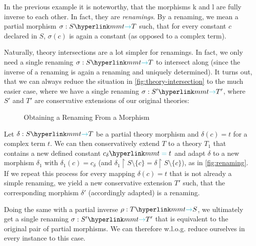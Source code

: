 In the previous example it is noteworthy, that the morphisms \textsf{k} and \textsf{l} are fully inverse to each other. In fact, they are \emph{renamings}.
By a renaming, we mean a partial morphism $\sigma:\viewto ST$ such, that for every constant $c$ declared in $S$, $\sigma(c)$ is again a constant (as opposed to a complex term). 

Naturally, theory intersections are a lot simpler for renamings. In fact, we only need a single renaming $\sigma:\viewto ST$ to intersect along (since the inverse of a renaming is again a renaming and uniquely determined).
It turns out, that we can always reduce the situation in \autoref{fig:theory-intersection} to the much easier case, where we have a single renaming $\sigma:\viewto{S'}{T'}$, where $S'$ and $T'$ are conservative extensions of our original theories:

\begin{figure}[ht]%
\centering
{}%
\caption{Obtaining a Renaming From a Morphism}\label{fig:renaming}%
\end{figure}

Let $\delta:\viewto ST$ be a partial theory morphism and $\delta(c)=t$ for a complex term $t$. We can then conservatively extend $T$ to a theory $T_1$ that contains a new defined constant $c_\delta\mmtdf t$ and adapt $\delta$ to a new morphism $\delta_1$ with $\delta_1(c)=c_\delta$ (and $\delta_1\upharpoonright S\setminus\{c\}=\delta\upharpoonright S\setminus\{c\}$), as in \autoref{fig:renaming}.
If we repeat this process for every mapping $\delta(c)=t$ that is not already a simple renaming, we yield a new conservative extension $T'$ such, that the corresponding morphism $\delta'$ (accordingly adapted) is a renaming.

Doing the same with a partial inverse $\rho:\viewto TS$, we ultimately get a single renaming $\sigma:\viewto{S'}{T'}$ that is equivalent to the original pair of partial morphisms. We can therefore w.l.o.g. reduce ourselves in every instance to this case.

